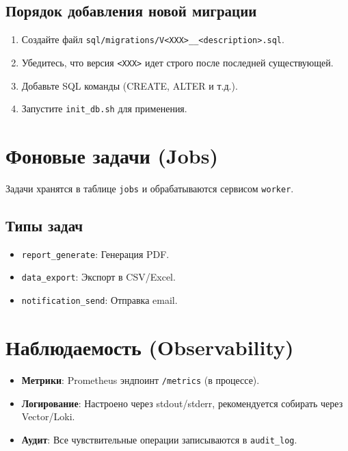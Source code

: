 \subsection{Порядок добавления новой
миграции}\label{ux43fux43eux440ux44fux434ux43eux43a-ux434ux43eux431ux430ux432ux43bux435ux43dux438ux44f-ux43dux43eux432ux43eux439-ux43cux438ux433ux440ux430ux446ux438ux438}

\begin{enumerate}
\def\labelenumi{\arabic{enumi}.}
\tightlist
\item
  Создайте файл
  \texttt{sql/migrations/V\textless{}XXX\textgreater{}\_\_\textless{}description\textgreater{}.sql}.
\item
  Убедитесь, что версия \texttt{\textless{}XXX\textgreater{}} идет
  строго после последней существующей.
\item
  Добавьте SQL команды (CREATE, ALTER и т.д.).
\item
  Запустите \texttt{init\_db.sh} для применения.
\end{enumerate}

\section{Фоновые задачи
(Jobs)}\label{ux444ux43eux43dux43eux432ux44bux435-ux437ux430ux434ux430ux447ux438-jobs}

Задачи хранятся в таблице \texttt{jobs} и обрабатываются сервисом
\texttt{worker}.

\subsection{Типы
задач}\label{ux442ux438ux43fux44b-ux437ux430ux434ux430ux447}

\begin{itemize}
\tightlist
\item
  \texttt{report\_generate}: Генерация PDF.
\item
  \texttt{data\_export}: Экспорт в CSV/Excel.
\item
  \texttt{notification\_send}: Отправка email.
\end{itemize}

\section{Наблюдаемость
(Observability)}\label{ux43dux430ux431ux43bux44eux434ux430ux435ux43cux43eux441ux442ux44c-observability}

\begin{itemize}
\tightlist
\item
  \textbf{Метрики}: Prometheus эндпоинт \texttt{/metrics} (в процессе).
\item
  \textbf{Логирование}: Настроено через stdout/stderr, рекомендуется
  собирать через Vector/Loki.
\item
  \textbf{Аудит}: Все чувствительные операции записываются в
  \texttt{audit\_log}.
\end{itemize}

